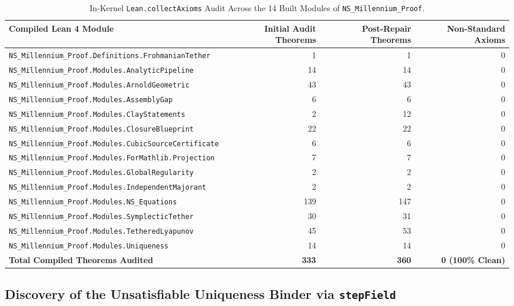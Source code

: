 \documentclass[11pt,a4paper]{article}
\theoremstyle{plain}
\theoremstyle{definition}
\begin{document}
\begin{table}[htbp]
\centering
\caption{In-Kernel \texttt{Lean.collectAxioms} Audit Across the 14 Built Modules of \texttt{NS\_Millennium\_Proof}.}
\label{tab:ns_modules}
\footnotesize
\begin{tabular}{@{}lrrr@{}}
\toprule
\textbf{Compiled Lean 4 Module} & \textbf{Initial Audit Theorems} & \textbf{Post-Repair Theorems} & \textbf{Non-Standard Axioms} \\
\midrule
\texttt{NS\_Millennium\_Proof.Definitions.FrohmanianTether} & 1 & 1 & 0 \\
\texttt{NS\_Millennium\_Proof.Modules.AnalyticPipeline} & 14 & 14 & 0 \\
\texttt{NS\_Millennium\_Proof.Modules.ArnoldGeometric} & 43 & 43 & 0 \\
\texttt{NS\_Millennium\_Proof.Modules.AssemblyGap} & 6 & 6 & 0 \\
\texttt{NS\_Millennium\_Proof.Modules.ClayStatements} & 2 & 12 & 0 \\
\texttt{NS\_Millennium\_Proof.Modules.ClosureBlueprint} & 22 & 22 & 0 \\
\texttt{NS\_Millennium\_Proof.Modules.CubicSourceCertificate} & 6 & 6 & 0 \\
\texttt{NS\_Millennium\_Proof.Modules.ForMathlib.Projection} & 7 & 7 & 0 \\
\texttt{NS\_Millennium\_Proof.Modules.GlobalRegularity} & 2 & 2 & 0 \\
\texttt{NS\_Millennium\_Proof.Modules.IndependentMajorant} & 2 & 2 & 0 \\
\texttt{NS\_Millennium\_Proof.Modules.NS\_Equations} & 139 & 147 & 0 \\
\texttt{NS\_Millennium\_Proof.Modules.SymplecticTether} & 30 & 31 & 0 \\
\texttt{NS\_Millennium\_Proof.Modules.TetheredLyapunov} & 45 & 53 & 0 \\
\texttt{NS\_Millennium\_Proof.Modules.Uniqueness} & 14 & 14 & 0 \\
\midrule
\textbf{Total Compiled Theorems Audited} & \textbf{333} & \textbf{360} & \textbf{0 (100\% Clean)} \\
\bottomrule
\end{tabular}
\end{table}

\subsection{Discovery of the Unsatisfiable Uniqueness Binder via \texttt{stepField}}
\end{document}
